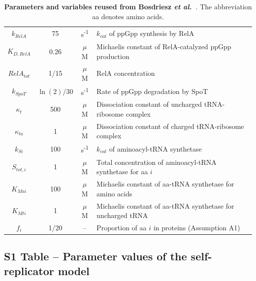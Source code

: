 \begin{table}[p]
\begin{tabular}{cccl}
$k_{RelA}$ & 75 & s\textsuperscript{-1} & $k_{cat}$ of ppGpp synthesis by RelA\\

$K_{D,RelA}$ & 0.26 & $\mu$M & Michaelis constant of RelA-catalyzed ppGpp production\\

$RelA_{tot}$ & 1/15 & $\mu$M & RelA concentration\\

$k_{SpoT}$ & $\ln (2) / 30$ & s\textsuperscript{-1} & Rate of ppGpp degradation by SpoT\\

$\kappa_t$ & 500 & $\mu$M & Dissociation constant of uncharged tRNA-ribosome complex\\

$\kappa_{ta}$ & 1 & $\mu$M & Dissociation constant of charged tRNA-ribosome complex\\

$k_{Si}$ & 100 & s\textsuperscript{-1} & $k_{cat}$ of aminoacyl-tRNA synthetase\\

$S_{tot,i}$ & 1 & $\mu$M & Total concentration of aminoacyl-tRNA synthetase for aa $i$\\

$K_{Mai}$ & 100 & $\mu$M & Michaelis constant of aa-tRNA synthetase for amino acids\\

$K_{Mti}$ & 1 & $\mu$M & Michaelis constant of aa-tRNA synthetase for uncharged tRNA\\

$f_i$ & 1/20 & -- & Proportion of aa $i$ in proteins (Assumption A1)\\

\end{tabular}
\caption{\textbf{Parameters and variables reused from Bosdriesz \textit{et al.}~\cite{bosdriesz_how_2015}}. The abbreviation aa denotes amino acids.}
\label{tab:notations}
\end{table}

\clearpage

\subsection{S1 Table -- Parameter values of the self-rep\-li\-cat\-or model}

